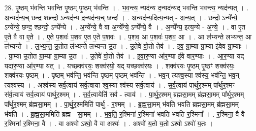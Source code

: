 \documentclass[17pt]{extarticle}
\begin{document}
28. पृ॒ष्ठम् भ॑वन्ति भवन्ति पृ॒ष्ठम् पृ॒ष्ठम् भ॑वन्ति । . भ॒व॒न्त्य॒ न्यद॑न्य द॒न्यद॑न्यद् भवन्ति भवन्त्य॒ न्यद॑न्यत् । . अ॒न्यद॑न्य॒च् छन्द॒ श्छन्दो॒ ऽन्यद॑न्य द॒न्यद॑न्य॒च् छन्दः॑ । . अ॒न्यद॑न्य॒दित्य॒न्यत् - अ॒न्य॒त् । . छन्दो॒ ऽन्ये᳚न्ये॒ ऽन्ये᳚न्ये॒ छन्द॒ श्छन्दो॒ ऽन्ये᳚न्ये । . अ॒न्ये᳚न्ये॒ वै वा अ॒न्ये᳚न्ये॒ ऽन्ये᳚न्ये॒ वै । . अ॒न्ये᳚न्य॒ इत्य॒न्ये - अ॒न्ये॒ । . वा ए॒त ए॒ते वै वा ए॒ते । . ए॒ते प॒शवः॑ प॒शव॑ ए॒त ए॒ते प॒शवः॑ । . प॒शव॒ आ प॒शवः॑ प॒शव॒ आ । . आ ल॑भ्यन्ते लभ्यन्त॒ आ ल॑भ्यन्ते । . ल॒भ्य॒न्त॒ उ॒तोत ल॑भ्यन्ते लभ्यन्त उ॒त । . उ॒तेवे॑ वो॒तो तेव॑ । . इ॒व॒ ग्रा॒म्या ग्रा॒म्या इ॑वेव ग्रा॒म्याः । . ग्रा॒म्या उ॒तोत ग्रा॒म्या ग्रा॒म्या उ॒त । . उ॒तेवे॑ वो॒तो तेव॑ । . इ॒वा॒र॒ण्या आ॑र॒ण्या इ॑वे वार॒ण्याः । . आ॒र॒ण्या यद् यदा॑र॒ण्या आ॑र॒ण्या यत् । . यच्छक्व॑रयः॒ शक्व॑रयो॒ यद् यच्छक्व॑रयः । . शक्व॑रयः पृ॒ष्ठम् पृ॒ष्ठꣳ शक्व॑रयः॒ शक्व॑रयः पृ॒ष्ठम् । . पृ॒ष्ठम् भव॑न्ति॒ भव॑न्ति पृ॒ष्ठम् पृ॒ष्ठम् भव॑न्ति । . भव॒न् त्यश्व॒स्या श्व॑स्य॒ भव॑न्ति॒ भव॒न् त्यश्व॑स्य । . अश्व॑स्य सर्व॒त्वाय॑ सर्व॒त्वाया श्व॒स्या श्व॑स्य सर्व॒त्वाय॑ । . स॒र्व॒त्वाय॑ पार्थुर॒श्मम् पा᳚र्थुर॒श्मꣳ स॑र्व॒त्वाय॑ सर्व॒त्वाय॑ पार्थुर॒श्मम् । . स॒र्व॒त्वायेति॑ सर्व - त्वाय॑ । . पा॒र्थु॒र॒श्मम् ब्र॑ह्मसा॒मम् ब्र॑ह्मसा॒मम् पा᳚र्थुर॒श्मम् पा᳚र्थुर॒श्मम् ब्र॑ह्मसा॒मम् । . पा॒र्थु॒र॒श्ममिति॑ पार्थु - र॒श्मम् । . ब्र॒ह्म॒सा॒मम् भ॑वति भवति ब्रह्मसा॒मम् ब्र॑ह्मसा॒मम् भ॑वति । . ब्र॒ह्म॒सा॒ममिति॑ ब्रह्म - सा॒मम् । . भ॒व॒ति॒ र॒श्मिना॑ र॒श्मिना॑ भवति भवति र॒श्मिना᳚ । . र॒श्मिना॒ वै वै र॒श्मिना॑ र॒श्मिना॒ वै । . वा अश्वो ऽश्वो॒ वै वा अश्वः॑ । . अश्वो॑ य॒तो य॒तो ऽश्वो ऽश्वो॑ य॒तः । \newline
\end{document}

